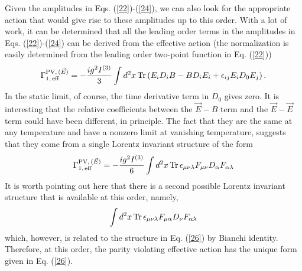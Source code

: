 \documentclass[a4paper,12pt]{article}
\begin{document}
Given the amplitudes in Eqs. (\ref{22})-(\ref{24}), we can also look for
the appropriate action that would give rise to these amplitudes up to
this order. With a lot of work, it can be determined that all
the leading order terms in the amplitudes in Eqs. (\ref{22})-(\ref{24})
can be derived from the effective action
(the normalization is easily determined from the leading order two-point
function in Eq. (\ref{22}))
\begin{equation}
\Gamma_{1,\,{\rm eff}}^{{\rm PV},\,(\vec{E})} = 
-{i g^2 I^{(3)}\over 3}\int
d^{2}x\, {\rm Tr} \left(E_{i}D_{i}B - BD_{i}E_{i} +
  \epsilon_{ij}E_{i}D_{0}E_{j}\right).\label{25}
\end{equation}
In the static limit, of course, the time derivative term in $D_{0}$
gives zero. It is interesting that the relative coefficients between
the $\vec{E}-B$ term and the $\vec{E}-\vec{E}$ term could have been
different, in principle. The fact that they are the same at any
temperature  and have a
nonzero limit at vanishing temperature, suggests that they come from a
single Lorentz invariant structure of the form
\begin{equation}
\Gamma_{1,\,{\rm eff}}^{{\rm PV},\,(\vec{E})} = -{i g^2 I^{(3)}\over 6}
\int d^{2}x\, {\rm Tr}\,\epsilon_{\mu\nu\lambda}
F_{\mu\nu}D_{\alpha}F_{\alpha\lambda}\label{26}
\end{equation}
It is worth pointing out here that there is a second possible Lorentz
invariant structure that is available at this order, namely,
\[
\int d^{2}x\,{\rm
  Tr}\,\epsilon_{\mu\nu\lambda}F_{\mu\alpha}D_{\nu}F_{\alpha\lambda}
\]
which, however, is related to the structure in Eq. (\ref{26}) by
Bianchi identity. Therefore, at this order, the parity violating
effective action has the unique form given in Eq. (\ref{26}).
\end{document}
